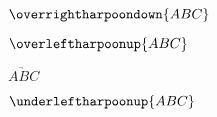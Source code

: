 \documentclass{article}
\begin{document}
\begin{dispExample}
$ \overrightharpoondown{ABC} $
\end{dispExample}

\begin{dispExample}
$ \overleftharpoonup{ABC} $
\end{dispExample}

\begin{dispExample}
$ \underrightharpoondown{ABC} $
\end{dispExample}

\begin{dispExample}
$ \underleftharpoonup{ABC} $
\end{dispExample}
\end{document}
